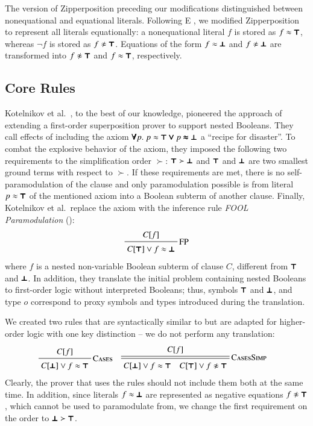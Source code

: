 The version of Zipperposition preceding our modifications distinguished between non\-equational
and equational literals. Following E \cite{scv-19-e23}, we
modified Zipperposition to represent all literals equationally: a nonequational
literal $f$ is stored as $f \approx \pmb{\top}$, whereas $\neg f$ is stored as $f
\noteq \itrue$. Equations of the form $f \approx \pmb{\bot} $ and $f \noteq \ifalse$ are
transformed into $f \noteq \itrue$ and $f \approx \pmb{\top}$, respectively.

\subsection{Core Rules}
\label{subsect:bool:core}

Kotelnikov et al.\ \cite{kotelnikov-15-fool}, to the best of our
knowledge, pioneered the approach of extending a first-order superposition prover to support
nested Booleans. They call effects of including the axiom $\pmb{\forall}
p. \; p \approx \pmb{\top} \pmb{\lor} p \pmb{\approx} \pmb{\bot}$ a  ``recipe for disaster''. To combat the
explosive behavior of the axiom, they imposed the following two requirements to
the simplification order $\succ$: $\pmb{\top} \succ \pmb{\bot}$ and
$\pmb{\top}$ and $\pmb{\bot}$ are two smallest ground terms with respect to $\succ$. If
these requirements are met, there is no self-paramodulation of the clause
and only paramodulation possible is from literal $p \approx \pmb{\top}$ of the mentioned axiom
into a Boolean subterm of another clause. Finally, Kotelnikov et al.\ replace
the axiom with the inference rule \emph{FOOL Paramodulation} ():
\pagebreak[2]
%
$$ \namedinference{FP}{C[f]}{C[\itrue] \vee f \eq \ifalse} $$
%
where $f$ is a nested non-variable Boolean subterm of clause $C$, different from
$\pmb{\top}$ and $\pmb{\bot}$. In addition, they translate the initial problem containing nested
Booleans  to first-order logic without interpreted Booleans; thus, symbols $\pmb{\top}$ and $\pmb{\bot}$, and type $o$
correspond to proxy symbols and types introduced during the translation. 

We created two rules that are syntactically similar to  but
are adapted for higher-order logic with one key distinction -- we do not perform any translation:
%
\begin{align*}
  & \namedinference{Cases}{C[f]}{C[\ifalse] \vee f \eq \itrue}
  && \namedsimp{CasesSimp}{C[f]}{C[\ifalse] \vee f \eq \itrue \quad C[\itrue] \vee f \noteq \itrue}
\end{align*}
%
Clearly, the prover that uses the rules should not include them both at the same time.
In addition, since
literals $f \approx \pmb{\bot}$ are represented as negative equations $f \noteq \itrue$, which cannot be used to paramodulate from,
we change the first requirement on the order to $\pmb{\bot} \succ
\pmb{\top}$.

